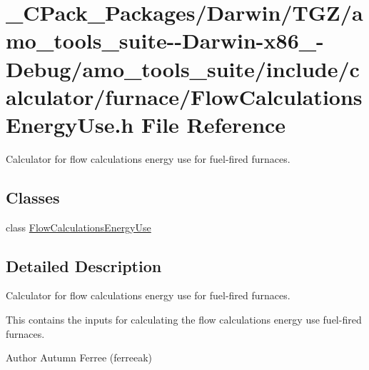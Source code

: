 \hypertarget{___c_pack___packages_2_darwin_2_t_g_z_2amo__tools__suite--_darwin-x86__64-_debug_2amo__tools__suac8aba939ac629baeff7b7587b613b2d}{}\section{\+\_\+\+C\+Pack\+\_\+\+Packages/\+Darwin/\+T\+G\+Z/amo\+\_\+tools\+\_\+suite-\/-\/\+Darwin-\/x86\+\_-\/\+Debug/amo\+\_\+tools\+\_\+suite/include/calculator/furnace/\+Flow\+Calculations\+Energy\+Use.h File Reference}
\label{___c_pack___packages_2_darwin_2_t_g_z_2amo__tools__suite--_darwin-x86__64-_debug_2amo__tools__suac8aba939ac629baeff7b7587b613b2d}


Calculator for flow calculations energy use for fuel-\/fired furnaces.  


\subsection*{Classes}
\begin{DoxyCompactItemize}
\item 
class \hyperlink{class_flow_calculations_energy_use}{Flow\+Calculations\+Energy\+Use}
\end{DoxyCompactItemize}


\subsection{Detailed Description}
Calculator for flow calculations energy use for fuel-\/fired furnaces. 

This contains the inputs for calculating the flow calculations energy use fuel-\/fired furnaces.

\begin{DoxyAuthor}{Author}
Autumn Ferree (ferreeak) 
\end{DoxyAuthor}
